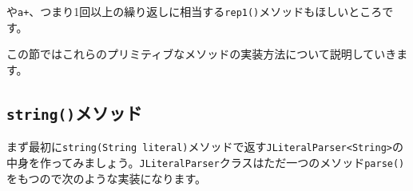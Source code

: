 や\texttt{a+}、つまり1回以上の繰り返しに相当する\texttt{rep1()}メソッドもほしいところです。

\begin{Shaded}
\begin{Highlighting}[]
\NormalTok{ (} \NormalTok{\textless{}}\NormalTok{\textless{}}\NormalTok{\textgreater{}\textgreater{}(}\NormalTok{(}\NormalTok{, }\NormalTok{, }\NormalTok{), }\NormalTok{(}
  \NormalTok{(}\NormalTok{(}\NormalTok{(}\NormalTok{)}
\NormalTok{);}
\end{Highlighting}
\end{Shaded}

この節ではこれらのプリミティブなメソッドの実装方法について説明していきます。

\hypertarget{chapter6-stringux30e1ux30bdux30c3ux30c9}{%
\subsection{\texorpdfstring{\texttt{string()}メソッド}{string()メソッド}}\label{chapter6-stringux30e1ux30bdux30c3ux30c9}}

まず最初に\texttt{string(String\ literal)}メソッドで返す\texttt{JLiteralParser\textless{}String\textgreater{}}の中身を作ってみましょう。\texttt{JLiteralParser}クラスはただ一つのメソッド\texttt{parse()}をもつので次のような実装になります。

